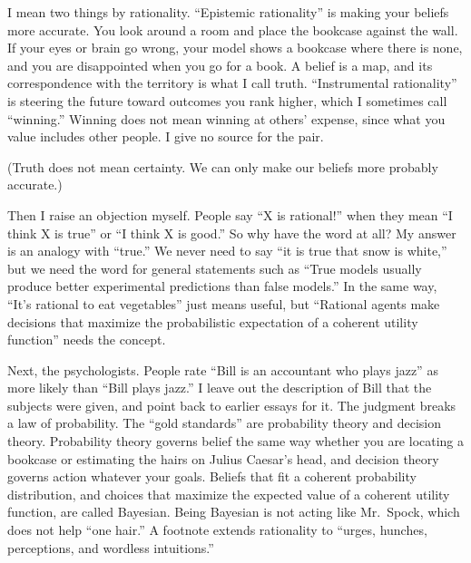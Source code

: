 
I mean two things by rationality. ``Epistemic rationality'' is making your beliefs more accurate. You look around a room and place the bookcase against the wall. If your eyes or brain go wrong, your model shows a bookcase where there is none, and you are disappointed when you go for a book. A belief is a map, and its correspondence with the territory is what I call truth. ``Instrumental rationality'' is steering the future toward outcomes you rank higher, which I sometimes call ``winning.'' Winning does not mean winning at others' expense, since what you value includes other people. I give no source for the pair. 

(Truth does not mean certainty. We can only make our beliefs more probably accurate.)

Then I raise an objection myself. People say ``X is rational!'' when they mean ``I think X is true'' or ``I think X is good.'' So why have the word at all? My answer is an analogy with ``true.'' We never need to say ``it is true that snow is white,'' but we need the word for general statements such as ``True models usually produce better experimental predictions than false models.'' In the same way, ``It's rational to eat vegetables'' just means useful, but ``Rational agents make decisions that maximize the probabilistic expectation of a coherent utility function'' needs the concept.

Next, the psychologists. People rate ``Bill is an accountant who plays jazz'' as more likely than ``Bill plays jazz.'' I leave out the description of Bill that the subjects were given, and point back to earlier essays for it.  The judgment breaks a law of probability. The ``gold standards'' are probability theory and decision theory. Probability theory governs belief the same way whether you are locating a bookcase or estimating the hairs on Julius Caesar's head, and decision theory governs action whatever your goals. Beliefs that fit a coherent probability distribution, and choices that maximize the expected value of a coherent utility function, are called Bayesian. Being Bayesian is not acting like Mr.\ Spock, which does not help ``one hair.'' A footnote extends rationality to ``urges, hunches, perceptions, and wordless intuitions.''

